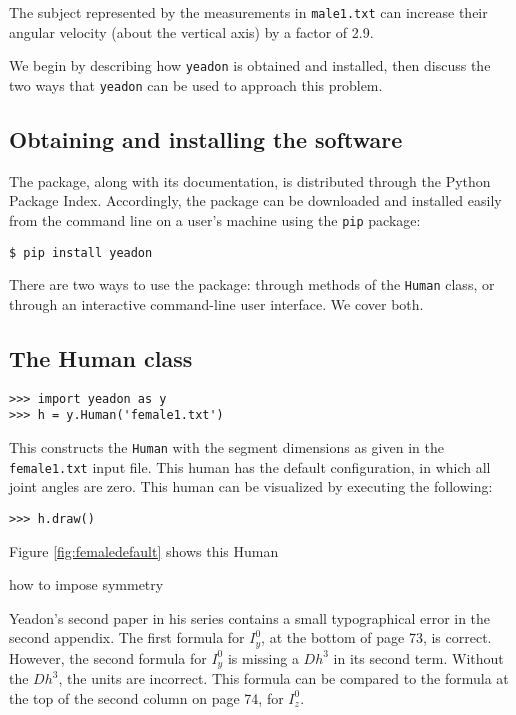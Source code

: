 \documentclass[10pt]{article}
\begin{document}
The subject represented by the measurements in \verb+male1.txt+ can increase
their angular velocity (about the vertical axis) by a factor of 2.9.

We begin by describing how \verb+yeadon+ is obtained and installed, then
discuss the two ways that \verb+yeadon+ can be used to approach this problem.

\subsection*{Obtaining and installing the software}

The package, along with its documentation, is distributed through the Python
Package Index. Accordingly, the package can be downloaded and installed easily
from the command line on a user's machine using the \verb+pip+ package:

\begin{verbatim}
$ pip install yeadon
\end{verbatim}

There are two ways to use the package: through methods of the \verb+Human+
class, or through an interactive command-line user interface. We cover both.



\subsection*{The Human class}

\begin{verbatim}
>>> import yeadon as y
>>> h = y.Human('female1.txt')
\end{verbatim}

This constructs the \verb+Human+ with the segment dimensions as given in the
\verb+female1.txt+ input file. This human has the default configuration, in
which all joint angles are zero. This human can be visualized by executing the
following:


\begin{verbatim}
>>> h.draw()
\end{verbatim}

Figure \ref{fig:femaledefault} shows this Human


how to impose symmetry

Yeadon's second paper in his series \cite{Yeadon1990f} contains a small
typographical error in the second appendix. The first formula for $I_y^0$, at
the bottom of page 73, is correct. However, the second formula for $I_y^0$ is
missing a $Dh^3$ in its second term. Without the $Dh^3$, the units are
incorrect. This formula can be compared to the formula at the top of the second
column on page 74, for $I_z^0$.
\end{document}
